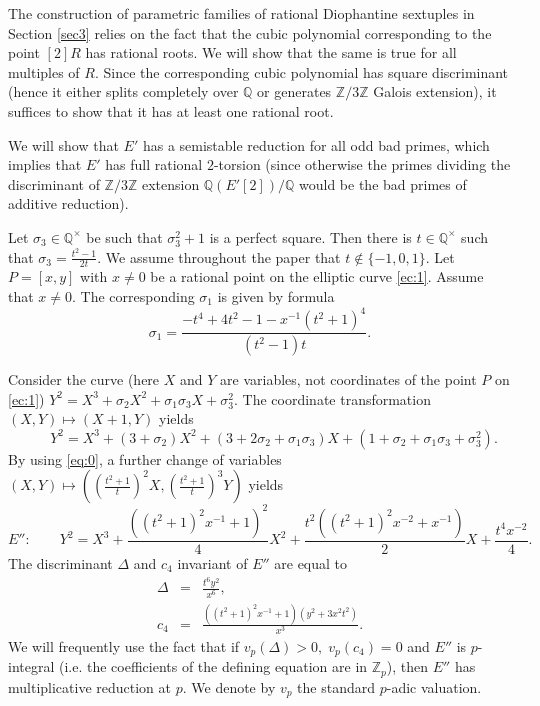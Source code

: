 \documentclass[11pt]{amsart}
\theoremstyle{plain}
\theoremstyle{remark}
\begin{document}
\noindent The construction of parametric families of rational Diophantine sextuples in Section \ref{sec3} relies on the fact that the cubic polynomial corresponding to the point $[2]R$ has rational roots. We will show that the same is true for all multiples of $R$. Since the corresponding cubic polynomial has square discriminant (hence it either splits completely over $\mathbb{Q}$ or generates $\mathbb{Z}/3\mathbb{Z}$ Galois extension), it suffices to show that it has at least one rational root.

We will show that $E'$ has a semistable reduction for all odd bad primes, which implies that $E'$ has full rational $2$-torsion (since otherwise the primes dividing the discriminant of $\mathbb{Z}/3\mathbb{Z}$ extension $\mathbb{Q}(E'[2])/\mathbb{Q}$ would be the bad primes of additive reduction).

Let $\sigma_3 \in \mathbb{Q}^\times$ be such that $\sigma_3^2+1$ is a perfect square. Then there is $t\in \mathbb{Q}^\times$ such that $\sigma_3=\frac{t^2-1}{2t}$. We assume throughout the paper that $t \notin  \{-1, 0, 1\}$. Let $P=[x,y]$ with $x \ne 0$ be a rational point on the elliptic curve \eqref{ec:1}. Assume that $x \ne 0$. The corresponding $\sigma_1$ is given by formula
\begin{equation}
\label{eq:0}
\sigma_1 = \frac{-t^4+4t^2-1-x^{-1}(t^2+1)^4}{(t^2-1)t}.
\end{equation}

Consider the curve (here $X$ and $Y$ are variables, not coordinates of the point $P$ on \eqref{ec:1}) $Y^2=X^3+ \sigma_2 X^2 +\sigma_1\sigma_3 X + \sigma_3^2.$ The coordinate transformation $(X,Y) \mapsto (X+1,Y)$ yields
$$
 \qquad Y^2 = X^3+(3+\sigma_2)X^2+(3+2\sigma_2+\sigma_1 \sigma_3) X + (1+\sigma_2+\sigma_1\sigma_3+\sigma_3^2).
$$
By using \eqref{eq:0}, a further change of variables $(X,Y) \mapsto ((\frac{t^2+1}{t})^2X, (\frac{t^2+1}{t})^3 Y)$ yields
\begin{equation}\label{eq:E''}
E'': \qquad Y^2 = X^3+\frac{((t^2+1)^2x^{-1}+1)^2}{4}X^2+\frac{t^2((t^2+1)^2x^{-2}+x^{-1})}{2} X + \frac{t^4x^{-2}}{4}.
\end{equation}
The discriminant $\Delta$ and $c_4$ invariant of $E''$ are equal to
\begin{eqnarray*}
\Delta &=&\displaystyle \frac{t^6y^2}{x^6}, \\
c_4 &=& \displaystyle \frac{((t^2+1)^2x^{-1}+1)(y^2+3x^2t^2)}{x^3}.
\end{eqnarray*}
We will frequently use the fact that if $v_p(\Delta)>0,\;v_p(c_4)=0$ and $E''$ is $p$-integral (i.e. the coefficients of the defining equation are in $\mathbb{Z}_p$), then $E''$ has multiplicative reduction at $p$.
We denote by $v_p$ the standard $p$-adic valuation.
\end{document}
